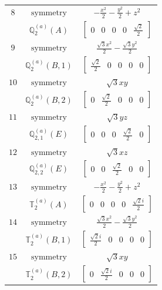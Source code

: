 \documentclass[fleqn,8pt,landscape]{jsarticle}
\begin{document}
\begin{longtable}{ccc}
$ 8 $ & $ \text{symmetry} $ & $ - \frac{x^{2}}{2} - \frac{y^{2}}{2} + z^{2} $ \\
$  $ & $ \mathbb{Q}_{2}^{(a)}(A) $ & $ \begin{bmatrix} 0 & 0 & 0 & 0 & \frac{\sqrt{2}}{2} \end{bmatrix} $ \\ \hline
$ 9 $ & $ \text{symmetry} $ & $ \frac{\sqrt{3} x^{2}}{2} - \frac{\sqrt{3} y^{2}}{2} $ \\
$  $ & $ \mathbb{Q}_{2}^{(a)}(B,1) $ & $ \begin{bmatrix} \frac{\sqrt{2}}{2} & 0 & 0 & 0 & 0 \end{bmatrix} $ \\ \hline
$ 10 $ & $ \text{symmetry} $ & $ \sqrt{3} x y $ \\
$  $ & $ \mathbb{Q}_{2}^{(a)}(B,2) $ & $ \begin{bmatrix} 0 & \frac{\sqrt{2}}{2} & 0 & 0 & 0 \end{bmatrix} $ \\ \hline
$ 11 $ & $ \text{symmetry} $ & $ \sqrt{3} y z $ \\
$  $ & $ \mathbb{Q}_{2,1}^{(a)}(E) $ & $ \begin{bmatrix} 0 & 0 & 0 & \frac{\sqrt{2}}{2} & 0 \end{bmatrix} $ \\ \hline
$ 12 $ & $ \text{symmetry} $ & $ \sqrt{3} x z $ \\
$  $ & $ \mathbb{Q}_{2,2}^{(a)}(E) $ & $ \begin{bmatrix} 0 & 0 & \frac{\sqrt{2}}{2} & 0 & 0 \end{bmatrix} $ \\ \hline
$ 13 $ & $ \text{symmetry} $ & $ - \frac{x^{2}}{2} - \frac{y^{2}}{2} + z^{2} $ \\
$  $ & $ \mathbb{T}_{2}^{(a)}(A) $ & $ \begin{bmatrix} 0 & 0 & 0 & 0 & \frac{\sqrt{2} i}{2} \end{bmatrix} $ \\ \hline
$ 14 $ & $ \text{symmetry} $ & $ \frac{\sqrt{3} x^{2}}{2} - \frac{\sqrt{3} y^{2}}{2} $ \\
$  $ & $ \mathbb{T}_{2}^{(a)}(B,1) $ & $ \begin{bmatrix} \frac{\sqrt{2} i}{2} & 0 & 0 & 0 & 0 \end{bmatrix} $ \\ \hline
$ 15 $ & $ \text{symmetry} $ & $ \sqrt{3} x y $ \\
$  $ & $ \mathbb{T}_{2}^{(a)}(B,2) $ & $ \begin{bmatrix} 0 & \frac{\sqrt{2} i}{2} & 0 & 0 & 0 \end{bmatrix} $ \\ \hline

\end{longtable}
\end{document}
